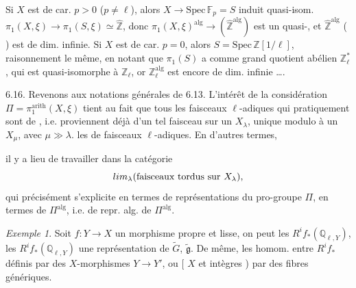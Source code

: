 \documentclass[11pt,a4paper]{article}
\begin{document}
Si $X$ est de car. $p > 0$ ($p \neq \ell$), alors $X \to \mathrm{Spec}\,\mathbb{F}_p = S$
induit \struck{\ill{}} quasi-isom. $\pi_1(X,\xi) \to \pi_1(S,\xi) \simeq \hat{\mathbb{Z}}$,
donc \struck{\ill{}} $\pi_1(X,\xi)^{\mathrm{alg}} \to (\hat{\mathbb{Z}}^{\mathrm{alg}})$ est un
quasi-\struck{\ill{}}, et $\hat{\mathbb{Z}}^{\mathrm{alg}}$ (
  ) est de dim. infinie. Si $X$ est de
car. $p = 0$, alors  $S = \mathrm{Spec}\,\mathbb{Z}[1/\ell]$,
  raisonnement
 le même, en notant que $\pi_1(S)$ a  comme
 grand quotient abélien $\mathbb{Z}_\ell^{*}$, qui est
quasi-isomorphe à $\mathbb{Z}_\ell$, or $\mathbb{Z}_\ell^{\mathrm{alg}}$ est encore de
dim. infinie ….

6.16. Revenons aux notations générales de 6.13. L'intérêt de la considération
\struck{\ill{}}  $\Pi = \pi_1^{\mathrm{arith}}(X,\xi)$ tient au fait que
tous les faisceaux $\ell$-adiques  \struck{\ill{}}
 qui  pratiquement sont de
 , i.e. proviennent déjà d'un tel faisceau
sur un $X_\lambda$,  unique modulo  à un $X_\mu$, avec
$\mu \gg \lambda$.  \struck{\ill{},} \ill{}  
 les  de faisceaux $\ell$-adiques. En d'autres termes,

il y a lieu de travailler dans la catégorie
\[
  \varinjlim_\lambda (\text{faisceaux tordus sur } X_\lambda),
\]
qui précisément s'explicite en termes de représentations 
 du pro-groupe $\Pi$,  en termes de
$\Pi^{\mathrm{alg}}$, i.e. de repr. alg. de $\Pi^{\mathrm{alg}}$.

\emph{Exemple 1}. Soit $f : Y \to X$ un morphisme propre et lisse, on peut
 les $R^{i}f_*(\mathbb{Q}_{\ell,Y})$, \uncertain{\ill{}}
 les $R^{i}f_*(\mathbb{Q}_{\ell,Y})$ 
une représentation de $\widetilde{G}$,  $\widetilde{\mathfrak{g}}$. De même,
les homom. entre $R^{i}f_*$ définis par des $X$-morphismes $Y \to Y'$, ou
[ \struck{\ill{}}   $X$
et intègres ) par des \struck{\ill{}} \struck{\ill{}} 
    fibres
génériques.
\end{document}
